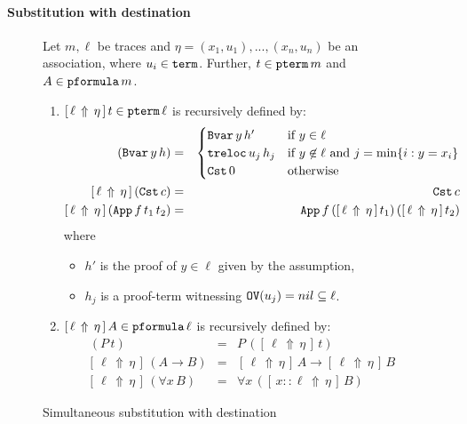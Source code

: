 \documentclass{svjour3}                     %
\newcommand{\substa}[3]{[\,#3\, \Uparrow\, #2\,]\, #1}
\newcommand{\menge}[2]{\{ #1 : #2 \}}
\newcommand{\tm}{\subseteq}
\newcommand{\tApp}{\textup{\tt App}}
\newcommand{\tBvar}{\textup{\tt Bvar}}
\newcommand{\tCst}{\textup{\tt Cst}}
\newcommand{\tpterm}{\textup{\tt pterm}}
\newcommand{\tpfml}{\textup{\tt pformula}}
\newcommand{\tterm}{\textup{\tt term}}
\newcommand{\tPH}{\textup{\tt OV}}
\newcommand{\ttlift}{\textup{\tt treloc}}
\begin{document}
\paragraph{\bf Substitution with destination}
\begin{figure}[t]
  Let $m, \ell$ be traces and $\eta = (x_1, u_1), ..., (x_n,u_n)$ be an association, where $u_i \in \tterm$. Further, $t \in \tpterm \, m$ and $A \in \tpfml \, m$.
  \begin{enumerate}
  \item $\substa{t}{\eta}{\ell} \in \tpterm\, \ell$ is recursively defined by:
  \begin{eqnarray}
    \substa{(\tBvar\, y \, h)}{\eta}{\ell} & = &
    \begin{cases}
      \tBvar\, y\, h' & \text{if $y \in \ell$}\\
      \ttlift\, u_j\, h_j & \text{if $y \not\in\ell$ and $j = \min \menge{i}{y = x_i}$} \\
      \tCst \, 0 & \text{otherwise}
    \end{cases} \label{bvar-case} \\
    \substa{(\tCst\, c)}{\eta}{\ell} & = & \tCst\, c \nonumber \\
    \substa{(\tApp\, f\, t_1\, t_2)}{\eta}{\ell} & = & \tApp\, f\, (\substa{t_1}{\eta}{\ell})\, (\substa{t_2}{\eta}{\ell}) \nonumber
  \end{eqnarray}
  where
  \begin{itemize}
  \item $h'$ is the proof of $y \in \ell$ given by the assumption,
  \item $h_j$ is a proof-term witnessing $\tPH(u_j) = nil \tm \ell$. \smallskip
  \end{itemize} \medskip

\item $\substa{A}{\eta}{\ell} \in \tpfml\, \ell$ is recursively defined by:
\begin{eqnarray}
  \substa{(P\, t)}{\eta}{\ell} & = & P\, (\substa{t}{\eta}{\ell}) \nonumber\\
  \substa{(A \to B)}{\eta}{\ell} & = & \substa{A}{\eta}{\ell} \to \substa{B}{\eta}{\ell} \nonumber\\
  \substa{(\forall x\, B)}{\eta}{\ell} & = & \forall x\, (\substa{B}{\eta}{x::\ell})\label{allBinder}
\end{eqnarray}
\end{enumerate}

\hrulefill
\caption{Simultaneous substitution with destination}
  \label{fig:substitution}
\end{figure}
\end{document}
